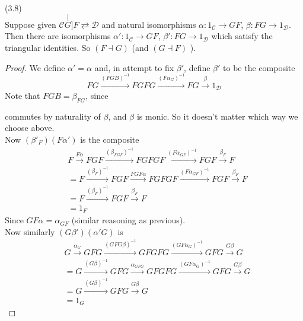 \documentclass[a4paper]{article}
\begin{document}
\begin{lemma} (3.8)\\
    Suppose given $\mathcal{C} \stackrel[G]{F}{\rightleftarrows} \mathcal{D}$ and natural isomorphisms $\alpha:1_{\mathcal{C}} \to GF$, $\beta: FG \to 1_{\mathcal{D}}$. Then there are isomorphisms $\alpha': 1_{\mathcal{C}} \to GF$, $\beta':FG \to 1_{\mathcal{D}}$ which satisfy the triangular identities. So $(F \dashv G)$ (and $(G \dashv F)$ ).
    \begin{proof}
        We define $\alpha'=\alpha$ and, in attempt to fix $\beta'$, define $\beta'$ to be the composite
        $$FG \xrightarrow{(FGB)^{-1}} FGFG \xrightarrow{(F\alpha_G)^{-1}} FG \xrightarrow{\beta} 1_{\mathcal{D}}$$
        Note that $FGB = \beta_{FG}$, since


        commutes by naturality of $\beta$, and $\beta$ is monic. So it doesn't matter which way we choose above.\\
        Now $(\beta'_F)(F\alpha')$ is the composite
        \begin{equation*}
            \begin{aligned}
                &F \xrightarrow{F\alpha} FGF \xrightarrow{(\beta_{FGF})^{-1}} FGFGF \xrightarrow{(F\alpha_{GF})^{-1}} FGF \xrightarrow{\beta_F} F\\
                &=F\xrightarrow{(\beta_F)^{-1}} FGF \xrightarrow{FGF\alpha} FGFGF \xrightarrow{(F\alpha_{GF})^{-1}} FGF \xrightarrow{\beta_F} F\\
                &= F \xrightarrow{(\beta_F)^{-1}} FGF \xrightarrow{\beta_F} F\\
                &= 1_F
            \end{aligned}
        \end{equation*}
        Since $GF\alpha = \alpha_{GF}$ (similar reasoning as previous).\\
        Now similarly $(G\beta')(\alpha'G)$ is
        \begin{equation*}
            \begin{aligned}
                &G \xrightarrow{\alpha_G} GFG \xrightarrow{(GFG\beta)^{-1}} GFGFG\xrightarrow{(GF\alpha_G)^{-1}} GFG \xrightarrow{G\beta} G\\
                &= G \xrightarrow{(G\beta)^{-1}} GFG \xrightarrow{\alpha_{GFG}} GFGFG \xrightarrow{(GF\alpha_G)^{-1}} GFG \xrightarrow{G\beta} G\\
                &= G\xrightarrow{(G\beta)^{-1}} GFG \xrightarrow{G\beta} G\\
                &= 1_G
            \end{aligned}
        \end{equation*}
    \end{proof}
\end{lemma}
\end{document}
